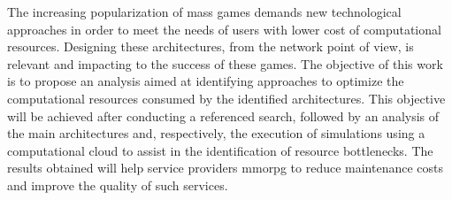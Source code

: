 The increasing popularization of mass games demands new technological approaches in order to meet the needs of users with lower cost of computational resources.
%
Designing these architectures, from the network point of view, is relevant and impacting to the success of these games.
%
The objective of this work is to propose an analysis aimed at identifying approaches to optimize the computational resources consumed by the identified architectures.
%
This objective will be achieved after conducting a referenced search, followed by an analysis of the main architectures and, respectively, the execution of simulations using a computational cloud to assist in the identification of resource bottlenecks.
%
The results obtained will help service providers \ac{mmorpg} to reduce maintenance costs and improve the quality of such services.
